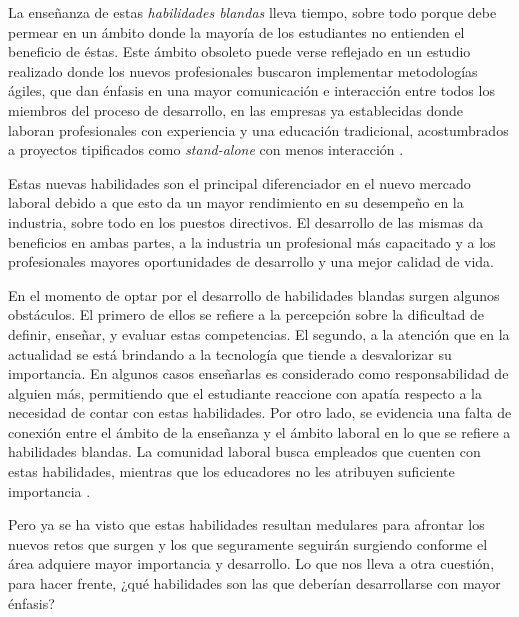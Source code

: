 \noindent La enseñanza de estas \textit{habilidades blandas} lleva tiempo, sobre todo porque debe permear en un ámbito donde la mayoría de los estudiantes  no entienden el beneficio de éstas. Este ámbito obsoleto puede verse reflejado en un estudio realizado donde los nuevos profesionales buscaron implementar metodologías ágiles, que dan énfasis en una mayor comunicación e interacción entre todos los miembros del proceso de desarrollo, en las empresas ya establecidas donde laboran profesionales con experiencia y una educación tradicional, acostumbrados a proyectos tipificados como \textit{stand-alone} con menos interacción \cite{IEEEreferencias:Web3}.
\vspace{5mm}

\noindent Estas nuevas habilidades son el principal diferenciador en el nuevo mercado laboral debido a que esto da un mayor rendimiento en su desempeño en la industria, sobre todo en los puestos directivos. El desarrollo de las mismas da beneficios en ambas partes, a la industria un profesional más capacitado y a los profesionales mayores oportunidades de desarrollo y una mejor calidad de vida. 
\vspace{5mm}

\noindent En el momento de optar por el desarrollo de habilidades blandas surgen algunos obstáculos. El primero de ellos se refiere a la percepción sobre la dificultad de definir, enseñar, y evaluar estas competencias. El segundo, a la atención que en la actualidad se está brindando a la tecnología que tiende a desvalorizar su importancia. En algunos casos enseñarlas es considerado como responsabilidad de alguien más, permitiendo que el estudiante reaccione con apatía respecto a la necesidad de contar con estas habilidades. Por otro lado, se evidencia una falta de conexión entre el ámbito de la enseñanza y el ámbito laboral en lo que se refiere a habilidades blandas. La comunidad laboral busca empleados que cuenten con estas habilidades, mientras que los educadores no les atribuyen suficiente importancia \cite{pcbee:2000}.
\vspace{5mm}

\noindent Pero ya se ha visto que estas habilidades resultan medulares para afrontar los nuevos retos que surgen y los que seguramente seguirán surgiendo conforme el área adquiere mayor importancia y desarrollo. Lo que nos lleva a otra cuestión, para hacer frente, ¿qué habilidades son las que deberían desarrollarse con mayor énfasis?
\vspace{5mm}

